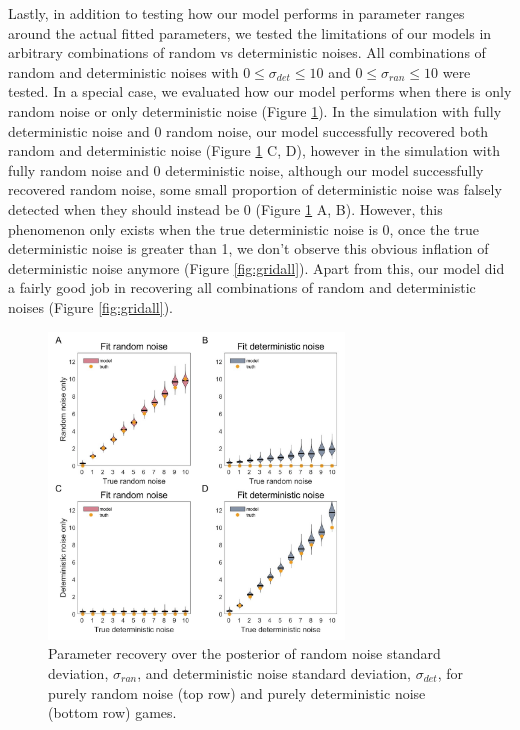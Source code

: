 \documentclass[12pt]{article}
\begin{document}
	Lastly, in addition to testing how our model performs in parameter ranges around the actual fitted parameters, we tested the limitations of our models in arbitrary combinations of random vs deterministic noises. All combinations of random and deterministic noises with $0 \le \sigma_{det} \le 10$ and $0 \le \sigma_{ran} \le 10$ were tested. In a special case, we evaluated how our model performs when there is only random noise or only deterministic noise (Figure \ref{fig:puredetran}). In the simulation with fully deterministic noise and 0 random noise, our model successfully recovered both random and deterministic noise (Figure \ref{fig:puredetran} C, D), however in the simulation with fully random noise and 0 deterministic noise, although our model successfully recovered random noise, some small proportion of deterministic noise was falsely detected when they should instead be 0 (Figure \ref{fig:puredetran} A, B). However, this phenomenon only exists when the true deterministic noise is 0, once the true deterministic noise is greater than 1, we don't observe this obvious inflation of deterministic noise anymore (Figure \ref{fig:gridall}). Apart from this, our model did a fairly good job in recovering all combinations of random and deterministic noises (Figure \ref{fig:gridall}).
	
	
	\begin{figure}[H]
		\begin{center}
			\includegraphics[width=0.7\textwidth]{figures/RDBayes_parameterrecovery_grid_pureRanDet.jpg}
			\caption{Parameter recovery over the posterior of random noise standard deviation, $\sigma_{ran}$, and deterministic noise standard deviation, $\sigma_{det}$, for purely random noise (top row) and purely deterministic noise (bottom row) games. 
			}
			\label{fig:puredetran}
		\end{center}
	\end{figure} 
\end{document}
